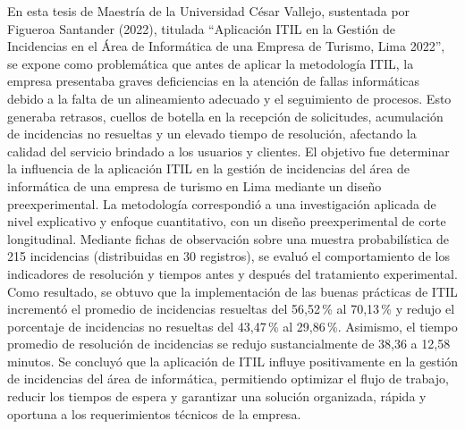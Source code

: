 En esta tesis de Maestría de la Universidad César Vallejo, sustentada por Figueroa Santander (2022), titulada ``Aplicación ITIL en la Gestión de Incidencias en el Área de Informática de una Empresa de Turismo, Lima 2022'', se expone como problemática que antes de aplicar la metodología ITIL, la empresa presentaba graves deficiencias en la atención de fallas informáticas debido a la falta de un alineamiento adecuado y el seguimiento de procesos. Esto generaba retrasos, cuellos de botella en la recepción de solicitudes, acumulación de incidencias no resueltas y un elevado tiempo de resolución, afectando la calidad del servicio brindado a los usuarios y clientes. El objetivo fue determinar la influencia de la aplicación ITIL en la gestión de incidencias del área de informática de una empresa de turismo en Lima mediante un diseño preexperimental. La metodología correspondió a una investigación aplicada de nivel explicativo y enfoque cuantitativo, con un diseño preexperimental de corte longitudinal. Mediante fichas de observación sobre una muestra probabilística de 215 incidencias (distribuidas en 30 registros), se evaluó el comportamiento de los indicadores de resolución y tiempos antes y después del tratamiento experimental. Como resultado, se obtuvo que la implementación de las buenas prácticas de ITIL incrementó el promedio de incidencias resueltas del 56,52\,\% al 70,13\,\% y redujo el porcentaje de incidencias no resueltas del 43,47\,\% al 29,86\,\%. Asimismo, el tiempo promedio de resolución de incidencias se redujo sustancialmente de 38,36 a 12,58 minutos. Se concluyó que la aplicación de ITIL influye positivamente en la gestión de incidencias del área de informática, permitiendo optimizar el flujo de trabajo, reducir los tiempos de espera y garantizar una solución organizada, rápida y oportuna a los requerimientos técnicos de la empresa.

\vspace{0.8em}

